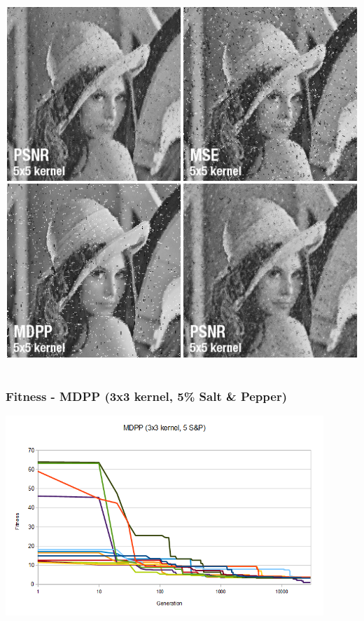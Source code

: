 \documentclass{beamer}
\begin{document}
\begin{frame}[t,fragile]
\begin{columns}[onlytextwidth]
			\begin{column}{0.6\textwidth}
				\includegraphics[width=\textwidth]{img/best25.jpg}
			\end{column}
		\end{columns}
			
	\end{frame}	
	

	\begin{frame}[t,fragile]
	\frametitle{Fitness - MDPP (3x3 kernel, 5\% Salt \& Pepper)}					
	\begin{center}
	\includegraphics[width=0.9\textwidth]{img/mdpp_3x3_5sp.png}
	
	\end{center}
	\end{frame}
	
\end{document}
